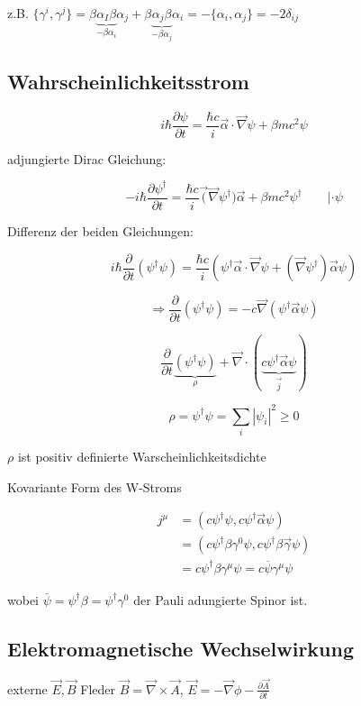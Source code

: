 z.B. \(\{\gamma^i,\gamma^j\}=\beta\underbrace{\alpha_I\beta}_{-\beta\alpha_i}\alpha_j + \beta\underbrace{\alpha_j\beta}_{-\beta\alpha_j}\alpha_i = -\{\alpha_i,\alpha_j\}=-2\delta_{ij}\)

\subsection{Wahrscheinlichkeitsstrom}

\[i\hbar \frac{\partial \psi}{\partial t} = \frac{\hbar c}{i}\vec \alpha\cdot\vec\nabla\psi+\beta mc^2\psi\]

adjungierte Dirac Gleichung:

\[-i\hbar \frac{\partial \psi^\dagger}{\partial t} = \frac{\hbar c}{i}\vec(\vec\nabla\psi^\dagger)\vec \alpha+\beta mc^2\psi^\dagger \qquad |\cdot \psi\]

Differenz der beiden Gleichungen:

\[ i\hbar\frac{\partial}{\partial t} (\psi^\dagger\psi) = \frac{\hbar c}{i}(\psi^\dagger \vec \alpha\cdot\vec\nabla\psi+(\vec\nabla\psi^\dagger)\vec\alpha \psi) \]

\[\Rightarrow \frac{\partial}{\partial t}(\psi^\dagger\psi) = -c\vec\nabla(\psi^\dagger\vec\alpha\psi)\]

\[ \frac{\partial}{\partial t}\underbrace{(\psi^\dagger\psi) }_{\rho}+\vec\nabla\cdot(\underbrace{c\psi^\dagger\vec\alpha\psi }_{\vec j}) \]


\[\rho =\psi^\dagger\psi = \sum_i|\psi_i|^2\geq 0 \]

\(\rho\) ist positiv definierte Warscheinlichkeitsdichte

Kovariante Form des W-Stroms

\begin{align}
j^\mu &= (c\psi^\dagger\psi ,c\psi^\dagger\vec\alpha\psi )\\
&= (c\psi^\dagger\beta\gamma^0\psi ,c\psi^\dagger\beta\vec\gamma\psi )\\
&= c\psi^\dagger \beta\gamma^\mu \psi = c\overline \psi\gamma^\mu \psi
\end{align}

wobei \(\overline \psi = \psi^\dagger\beta=\psi^\dagger\gamma^0\) der Pauli adungierte Spinor ist.


\subsection{Elektromagnetische Wechselwirkung}

externe \(\vec E,\vec B\) Fleder \(\vec B = \vec\nabla\times\vec A\), \(\vec E = -\vec\nabla\phi-\frac{\partial\vec A}{\partial t}\)

